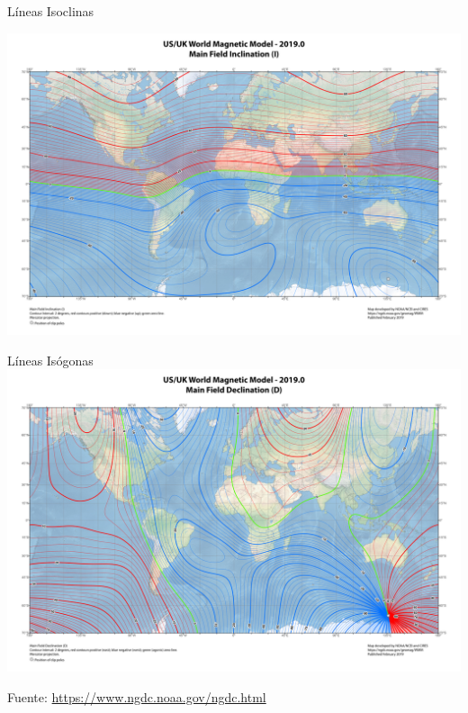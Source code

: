 \begin{frame}{L\'ineas Isoclinas}
  
 \includegraphics[width=\linewidth]{05.instrumentos.giroscopicos.imagenes/05.04.MagnetismoTerrestre/05-04-mapa_inclinacion.pdf}

\end{frame}

\begin{frame}{L\'ineas Is\'ogonas}
  \includegraphics[width=\linewidth]{05.instrumentos.giroscopicos.imagenes/05.04.MagnetismoTerrestre/05-04-mapa_declinacion_2019.pdf}

  {\tiny Fuente: \url{https://www.ngdc.noaa.gov/ngdc.html}
  }
  
\end{frame}


